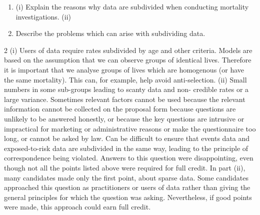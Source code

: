 \documentclass[a4paper,12pt]{article}
\begin{document}
\begin{enumerate}

\item %
(i) Explain the reasons why data are subdivided when conducting mortality
investigations.
(ii)

\item %

Describe the problems which can arise with subdividing data.



\end{enumerate}
\newpage

2
(i)
Users of data require rates subdivided by age and other criteria.
Models are based on the assumption that we can observe groups of identical lives.
Therefore it is important that we analyse groups of lives which are homogenous (or
have the same mortality).
This can, for example, help avoid anti-selection.
(ii)
Small numbers in some sub-groups leading to scanty data and non-
credible rates or a large variance.
Sometimes relevant factors cannot be used because the relevant information cannot be
collected on the proposal form because questions are unlikely to be answered
honestly,
or because the key questions are intrusive or impractical for marketing or
administrative reasons or make the questionnaire too long, or cannot be asked by law.
Can be difficult to ensure that events data and exposed-to-risk data are subdivided in
the same way, leading to the principle of correspondence being violated.
Answers to this question were disappointing, even though not all the points listed above were required for full credit. In part (ii), many candidates made only the first point, about sparse
data. Some candidates approached this question as practitioners or users of data rather than giving the general principles for which the question was asking. Nevertheless, if good points
were made, this approach could earn full credit.
\end{document}
